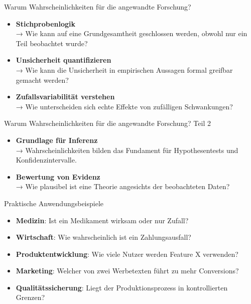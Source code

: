 \documentclass[
  ignorenonframetext,
]{beamer}
\providecommand{\tightlist}{%
  \setlength{\itemsep}{0pt}\setlength{\parskip}{0pt}}
\begin{document}
\begin{frame}{Warum Wahrscheinlichkeiten für die angewandte Forschung?}
\protect{}\label{warum-wahrscheinlichkeiten-fuxfcr-die-angewandte-forschung}
\begin{itemize}
\item
  \textbf{Stichprobenlogik}\\
  → Wie kann auf eine Grundgesamtheit geschlossen werden, obwohl nur ein
  Teil beobachtet wurde?
\item
  \textbf{Unsicherheit quantifizieren}\\
  → Wie kann die Unsicherheit in empirischen Aussagen formal greifbar
  gemacht werden?
\item
  \textbf{Zufallsvariabilität verstehen}\\
  → Wie unterscheiden sich echte Effekte von zufälligen Schwankungen?
\end{itemize}
\end{frame}

\begin{frame}{Warum Wahrscheinlichkeiten für die angewandte Forschung?
Teil 2}
\protect{}\label{warum-wahrscheinlichkeiten-fuxfcr-die-angewandte-forschung-teil-2}
\begin{itemize}
\item
  \textbf{Grundlage für Inferenz}\\
  → Wahrscheinlichkeiten bilden das Fundament für Hypothesentests und
  Konfidenzintervalle.
\item
  \textbf{Bewertung von Evidenz}\\
  → Wie plausibel ist eine Theorie angesichts der beobachteten Daten?
\end{itemize}
\end{frame}

\begin{frame}{Praktische Anwendungsbeispiele}
\protect{}\label{praktische-anwendungsbeispiele}
\begin{itemize}
\tightlist
\item
  \textbf{Medizin}: Ist ein Medikament wirksam oder nur Zufall?
\item
  \textbf{Wirtschaft}: Wie wahrscheinlich ist ein Zahlungsausfall?
\item
  \textbf{Produktentwicklung}: Wie viele Nutzer werden Feature X
  verwenden?
\item
  \textbf{Marketing}: Welcher von zwei Werbetexten führt zu mehr
  Conversions?
\item
  \textbf{Qualitätssicherung}: Liegt der Produktionsprozess in
  kontrollierten Grenzen?
\end{itemize}
\end{frame}
\end{document}
